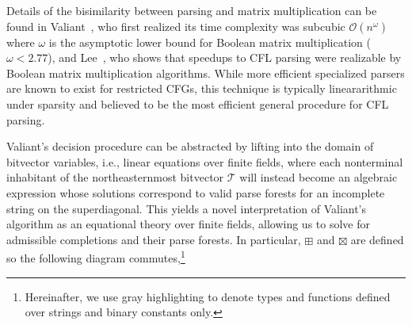 \documentclass[sigplan,review,anonymous,acmsmall]{acmart}\settopmatter{printfolios=false,printccs=false,printacmref=false}
\begin{document}
Details of the bisimilarity between parsing and matrix multiplication can be found in Valiant~\cite{valiant1975general}, who first realized its time complexity was subcubic $\mathcal{O}(n^\omega)$ where $\omega$ is the asymptotic lower bound for Boolean matrix multiplication ($\omega < 2.77$), and Lee~\cite{lee2002fast}, who shows that speedups to CFL parsing were realizable by Boolean matrix multiplication algorithms. While more efficient specialized parsers are known to exist for restricted CFGs, this technique is typically lineararithmic under sparsity and believed to be the most efficient general procedure for CFL parsing.

Valiant's decision procedure can be abstracted by lifting into the domain of bitvector variables, i.e., linear equations over finite fields, where each nonterminal inhabitant of the northeasternmost bitvector $\mathcal{T}$ will instead become an algebraic expression whose solutions correspond to valid parse forests for an incomplete string on the superdiagonal. This yields a novel interpretation of Valiant's algorithm as an equational theory over finite fields, allowing us to solve for admissible completions and their parse forests. In particular, $\boxplus$ and $\boxtimes$ are defined so the following diagram commutes,\footnote{Hereinafter, we use gray highlighting to denote types and functions defined over strings and binary constants only.}
\end{document}
